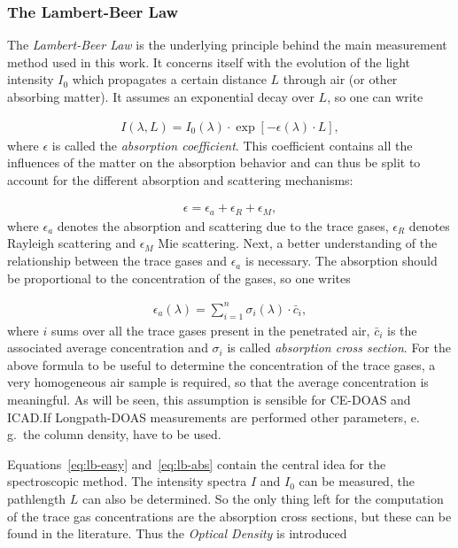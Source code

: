 \subsubsection{The Lambert-Beer Law}
\label{sec:lambert-beer}

The \emph{Lambert-Beer Law} is the underlying principle behind the
main measurement method used in this work. It concerns itself with the
evolution of the light intensity $I_0$ which propagates a certain
distance $L$ through air (or other absorbing matter). It assumes an
exponential decay over $L$, so one can write

\begin{align}
  I(\lambda, L) = I_0(\lambda) \cdot \exp[-\epsilon(\lambda) \cdot
  L], \label{eq:lb-easy}
\end{align}
where $\epsilon$ is called the \emph{absorption coefficient}. This
coefficient contains all the influences of the matter on the
absorption behavior and can thus be split to account for the different
absorption and scattering mechanisms:

\begin{align*}
  \epsilon = \epsilon_a + \epsilon_R + \epsilon_M,
\end{align*}
where $\epsilon_a$ denotes the absorption and scattering due to the
trace gases, $\epsilon_R$ denotes Rayleigh scattering and $\epsilon_M$
Mie scattering. Next, a better understanding of the relationship
between the trace gases and $\epsilon_a$ is necessary. The absorption
should be proportional to the concentration of the gases, so one
writes

\begin{align}
  \epsilon_a(\lambda) = \sum_{i=1}^n \sigma_i(\lambda) \cdot \bar c_i, \label{eq:lb-abs}
\end{align}
where $i$ sums over all the trace gases present in the penetrated air,
$\bar c_i$ is the associated average concentration and $\sigma_i$ is
called \emph{absorption cross section}. For the above formula to be
useful to determine the concentration of the trace gases, a very
homogeneous air sample is required, so that the average concentration
is meaningful. As will be seen, this assumption is sensible for
CE-DOAS and ICAD.\@{}If Longpath-DOAS measurements are performed other
parameters, e.\,g.\ the column density, have to be used.

Equations~\eqref{eq:lb-easy} and~\eqref{eq:lb-abs} contain the
central idea for the spectroscopic method. The intensity spectra $I$
and $I_0$ can be measured, the pathlength $L$ can also be
determined. So the only thing left for the computation of the trace
gas concentrations are the absorption cross sections, but these can be
found in the literature. Thus the \emph{Optical Density} is
introduced

